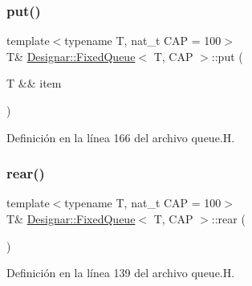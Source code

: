 \mbox{\label{class_designar_1_1_fixed_queue_a66a9b9f7118ec4943f7af273879c6b52}} 
\subsubsection{\texorpdfstring{put()}{put()}\hspace{0.1cm}{\footnotesize\ttfamily [2/2]}}
{\footnotesize\ttfamily template$<$typename T, nat\+\_\+t C\+AP = 100$>$ \\
T\& \hyperlink{class_designar_1_1_fixed_queue}{Designar\+::\+Fixed\+Queue}$<$ T, C\+AP $>$\+::put (\begin{DoxyParamCaption}\item[{T \&\&}]{item }\end{DoxyParamCaption})\hspace{0.3cm}{\ttfamily [inline]}}



Definición en la línea 166 del archivo queue.\+H.

\mbox{\label{class_designar_1_1_fixed_queue_a820470e5e649e48a352b334f158c8eb3}} 
\subsubsection{\texorpdfstring{rear()}{rear()}\hspace{0.1cm}{\footnotesize\ttfamily [1/2]}}
{\footnotesize\ttfamily template$<$typename T, nat\+\_\+t C\+AP = 100$>$ \\
T\& \hyperlink{class_designar_1_1_fixed_queue}{Designar\+::\+Fixed\+Queue}$<$ T, C\+AP $>$\+::rear (\begin{DoxyParamCaption}{ }\end{DoxyParamCaption})\hspace{0.3cm}{\ttfamily [inline]}}



Definición en la línea 139 del archivo queue.\+H.

\mbox{\label{class_designar_1_1_fixed_queue_ab634bd79b51287ddbcd1ba24bc72fcae}} 
